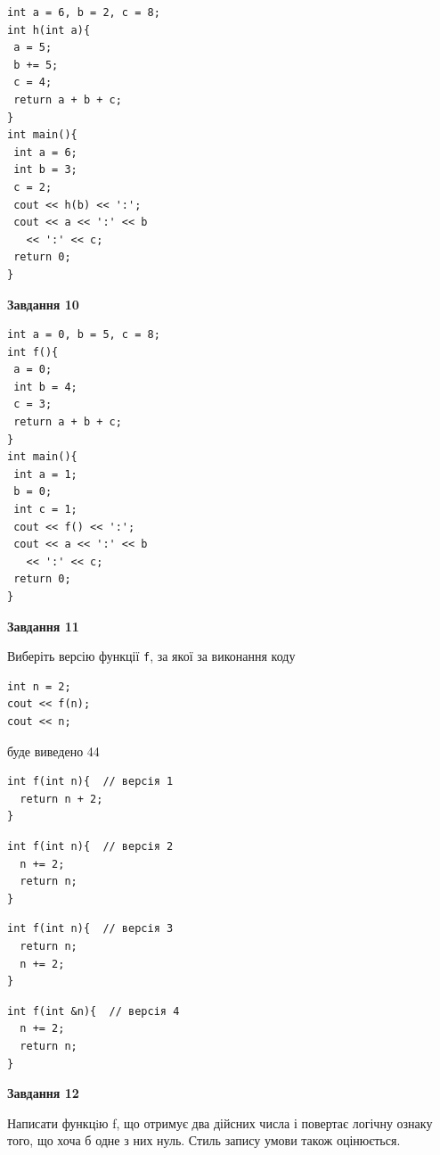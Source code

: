 \documentclass[12pt, ukrainian]{article}
\def\code#1{\Verb!#1!}
\begin{document}
{\begin {large}
\begin{minipage}[t]{7.0cm}
\begin{verbatim}
int a = 6, b = 2, c = 8;
int h(int a){
 a = 5;
 b += 5;
 c = 4;
 return a + b + c;
}
int main(){
 int a = 6;
 int b = 3;
 c = 2;
 cout << h(b) << ':';
 cout << a << ':' << b 
   << ':' << c;
 return 0;
}
\end{verbatim}



\begin{center}
\textbf{Завдання 10}
\end{center}
\vspace{-8mm}

\begin{verbatim}
int a = 0, b = 5, c = 8;
int f(){
 a = 0;
 int b = 4;
 c = 3;
 return a + b + c;
}
int main(){
 int a = 1;
 b = 0;
 int c = 1;
 cout << f() << ':';
 cout << a << ':' << b 
   << ':' << c;
 return 0;
}
\end{verbatim}

\end{minipage}
\vline \hspace{1mm}
\begin{minipage}[t]{11.0cm}

\begin{center}
\textbf{Завдання 11}
\end{center}
Виберіть версію функції \code{f}, за якої за виконання коду
\begin{verbatim}
int n = 2;
cout << f(n);
cout << n;
\end{verbatim}

буде виведено 44

\begin{verbatim}
int f(int n){  // версія 1
  return n + 2;
}
\end{verbatim}

\vspace{-8mm}\begin{verbatim}
int f(int n){  // версія 2
  n += 2;
  return n;
}
\end{verbatim}

\vspace{-8mm}\begin{verbatim}
int f(int n){  // версія 3
  return n;
  n += 2;
}
\end{verbatim}

\vspace{-8mm}\begin{verbatim}
int f(int &n){  // версія 4
  n += 2;
  return n;
}
\end{verbatim}



\begin{center}
\textbf{Завдання 12}
\end{center}

Написати функцiю f, що отримує два дійсних числа і повертає логічну ознаку того, що хоча б одне з них нуль. Стиль запису умови також оцінюється.\par

\end{minipage}

\end {large}}
\newpage
\end{document}
